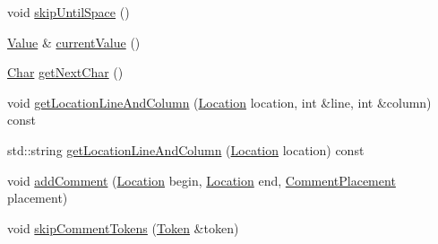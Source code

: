\begin{DoxyCompactItemize}
\item 
void \hyperlink{classJson_1_1Reader_ad922ea5a8ab333084edbb84827861fa3}{skip\-Until\-Space} ()
\item 
\hyperlink{classJson_1_1Value}{Value} \& \hyperlink{classJson_1_1Reader_a1cab5c0f13de764be705d636701ffbad}{current\-Value} ()
\item 
\hyperlink{classJson_1_1Reader_a3eec9118f3e9a672ba8348c3a79d0f45}{Char} \hyperlink{classJson_1_1Reader_a2e310761d1ccef53e8b78b5d78d6659b}{get\-Next\-Char} ()
\item 
void \hyperlink{classJson_1_1Reader_a20b3023dc422726e2e4ebe41b8ba0515}{get\-Location\-Line\-And\-Column} (\hyperlink{classJson_1_1Reader_a46795b5b272bf79a7730e406cb96375a}{Location} location, int \&line, int \&column) const 
\item 
std\-::string \hyperlink{classJson_1_1Reader_ac5b4b5a76d3224871519b0656393b35b}{get\-Location\-Line\-And\-Column} (\hyperlink{classJson_1_1Reader_a46795b5b272bf79a7730e406cb96375a}{Location} location) const 
\item 
void \hyperlink{classJson_1_1Reader_aaea3bd62d12ffb6117a61476c0685049}{add\-Comment} (\hyperlink{classJson_1_1Reader_a46795b5b272bf79a7730e406cb96375a}{Location} begin, \hyperlink{classJson_1_1Reader_a46795b5b272bf79a7730e406cb96375a}{Location} end, \hyperlink{namespaceJson_a4fc417c23905b2ae9e2c47d197a45351}{Comment\-Placement} placement)
\item 
void \hyperlink{classJson_1_1Reader_a22e677ef400d8223f27e631b4cd4b821}{skip\-Comment\-Tokens} (\hyperlink{classJson_1_1Reader_1_1Token}{Token} \&token)
\end{DoxyCompactItemize}
